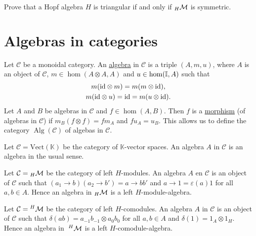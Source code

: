 \begin{exercise}\label{exercise:triangular}
Prove that a Hopf algebra $H$ is triangular if and only if ${}_{H}\mathcal{M}$ is
symmetric. 
\end{exercise}

\section{Algebras in categories}

\begin{definition}
Let $\mathcal{C}$ be a monoidal category. An \underline{algebra} in
$\mathcal{C}$ is a triple $(A,m,u)$, where $A$ is an object of
$\mathcal{C}$, $m\in\hom(A\otimes A,A)$ and $u\in\hom(\mathbb{I},A)$ such that 
\begin{gather*}
m(\mathrm{id}\otimes m)=m(m\otimes\mathrm{id}),\\
m(\mathrm{id}\otimes u)=\mathrm{id}=m(u\otimes\mathrm{id}).
\end{gather*}
Let $A$ and $B$ be algebras in $\mathcal{C}$ and $f\in\hom(A,B)$.
Then $f$ is a \underline{morphism} (of algebras in $\mathcal{C}$)
if $m_{B}(f\otimes f)=fm_{A}$ and $fu_{A}=u_{B}$. This allows
us to define the category $\operatorname{Alg}(\mathcal{C})$
of algebas in $\mathcal{C}$. 
\end{definition}

\begin{example}
Let $\mathcal{C}=\mathrm{Vect}(\mathbb{K})$ be the category of
$\mathbb{K}$-vector spaces. An algebra $A$ in $\mathcal{C}$ is an algebra in
the usual sense.
\end{example}

\begin{example}
Let $\mathcal{C}={}_{H}\mathcal{M}$ be the category of left $H$-modules.  An algebra $A$
en $\mathcal{C}$ is an object of $\mathcal{C}$ such that $(a_{1}\to b)(a_{2}\to
b')=a\to bb'$ and $a\to1=\varepsilon(a)1$ for all $a,b\in A$. Hence an algebra
in ${}_{H}\mathcal{M}$ is a left $H$-module-algebra.
\end{example}

\begin{example}
Let $\mathcal{C=}\;^{H}\mathcal{M}$ be the category of left $H$-comodules.  An algebra
$A$ in $\mathcal{C}$ is an object of $\mathcal{C}$ such that
$\delta(ab)=a_{-1}b{}_{-1}\otimes a_{0}b{}_{0}$ for all $a,b\in A$ and
$\delta(1)=1_{A}\otimes1_{H}$.  Hence an algebra in $\;^{H}\mathcal{M}$ is a left
$H$-comodule-algebra.
\end{example}

